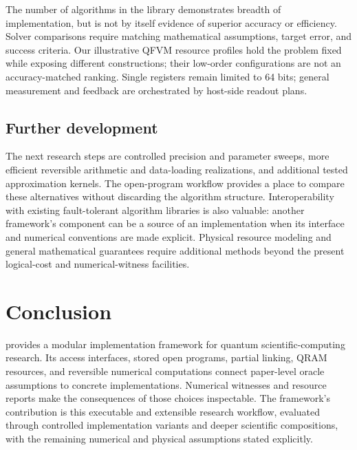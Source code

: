 The number of algorithms in the library demonstrates breadth of
implementation, but is not by itself evidence of superior accuracy or
efficiency. Solver comparisons require matching mathematical assumptions,
target error, and success criteria. Our illustrative QFVM resource
profiles hold the problem fixed while exposing different constructions;
their low-order configurations are not an accuracy-matched ranking.
Single registers remain limited to 64 bits; general measurement and
feedback are orchestrated by host-side readout plans.

\subsection{Further development}
\label{sec:future}

The next research steps are controlled precision and parameter sweeps,
more efficient reversible arithmetic and data-loading realizations, and
additional tested approximation kernels. The open-program workflow
provides a place to compare these alternatives without discarding the
algorithm structure. Interoperability with existing fault-tolerant
algorithm libraries is also valuable: another framework's component can
be a source of an implementation when its interface and numerical
conventions are made explicit. Physical resource modeling and general
mathematical guarantees require additional methods beyond the present
logical-cost and numerical-witness facilities.

\section{Conclusion}
\label{sec:conclusion}

\pqlang{} provides a modular implementation framework for quantum
scientific-computing research. Its access interfaces, stored open
programs, partial linking, QRAM resources, and reversible numerical
computations connect paper-level oracle assumptions to concrete
implementations. Numerical witnesses and resource reports make the
consequences of those choices inspectable. The framework's contribution
is this executable and extensible research workflow, evaluated through
controlled implementation variants and deeper scientific compositions,
with the remaining numerical and physical assumptions stated explicitly.
